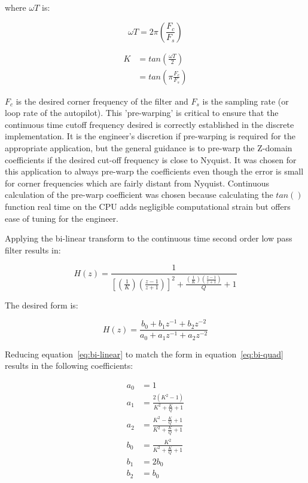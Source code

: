 where $\omega T$ is:

\begin{equation}
 \omega T = 2\pi\left(\frac{F_c}{F_s}\right)
\end{equation}

\begin{equation}
\begin{split}
 K &= tan\left(\frac{\omega T}{2}\right) \\
 &= tan\left(\pi\frac{F_c}{F_s}\right)
\end{split}
\end{equation}



$F_c$ is the desired corner frequency of the filter and $F_s$ is the sampling rate (or loop rate of the autopilot).
This 'pre-warping' is critical to ensure that the continuous time cutoff frequency desired is correctly established in the discrete implementation.  It is the engineer's discretion if pre-warping is required for the appropriate application, but the general guidance is to pre-warp the Z-domain coefficients if the desired cut-off frequency is close to Nyquist.  It was chosen for this application to always pre-warp the coefficients even though the error is small for corner frequencies which are fairly distant from Nyquist.  Continuous calculation of the pre-warp coefficient was chosen because calculating the $tan()$ function real time on the CPU adds negligible computational strain but offers ease of tuning for the engineer.

Applying the bi-linear transform to the continuous time second order low pass filter results in:

\begin{equation}\label{eq:bi-linear}
 H(z) = \frac{1}{ \left[\left(\frac{1}{K}\right)\left(\frac{z-1}{z+1}\right)\right]^2+\frac{ \left(\frac{1}{K}\right)\left(\frac{z-1}{z+1}\right)}{Q}+1}
\end{equation}

The desired form is:

\begin{equation}\label{eq:bi-quad}
 H(z) = \frac{b_0 + b_1 z^{-1} + b_2 z^{-2}}{a_0 + a_1 z^{-1} + a_2 z^{-2}}
\end{equation}

Reducing equation~\ref{eq:bi-linear} to match the form in equation~\ref{eq:bi-quad} results in the following coefficients:

\begin{equation}
\begin{split}
 a_0 &= 1 \\
 a_1 &= \frac{2(K^2-1)}{K^2+\frac{K}{Q}+1} \\
 a_2 &= \frac{K^2-\frac{K}{Q}+1}{K^2+\frac{K}{Q}+1} \\
 b_0 &= \frac{K^2}{K^2+\frac{K}{Q}+1} \\
 b_1 &= 2b_0 \\
 b_2 &= b_0  
\end{split}
\end{equation}

